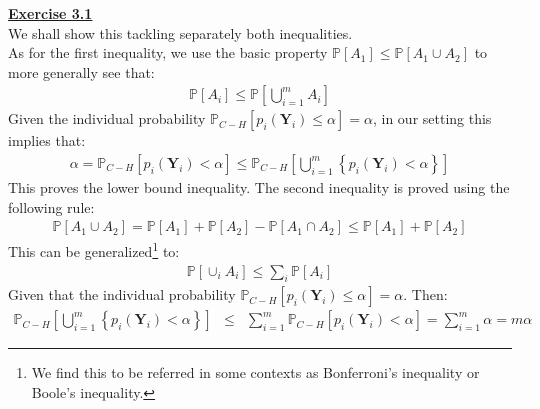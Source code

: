 \documentclass[a4paper, 11pt]{article}
\begin{document}
\newpage
\textbf{\underline{Exercise 3.1}}\\
\newline We shall show this tackling separately both inequalities.\\
\newline As for the first inequality, we use the basic property $\mathbb{P}[A_1] \leq \mathbb{P}[A_1 \cup A_2]$ to more generally see that:
\begin{eqnarray}
\mathbb{P}[A_i] \leq \mathbb{P}\left[ \bigcup_{i=1}^{m} A_i \right] \nonumber
\end{eqnarray}
Given the individual probability $\mathbb{P}_{C-H}[p_{i}(\mathbf{Y}_i) \leq \alpha] = \alpha$, in our setting this implies that:
\begin{eqnarray}
\alpha = \mathbb{P}_{C-H}[p_i(\mathbf{Y}_i) < \alpha] \leq \mathbb{P}_{C-H} \left[ \bigcup_{i=1}^{m} \left\lbrace p_i(\mathbf{Y}_i) < \alpha \right\rbrace \right] \nonumber
\end{eqnarray}
This proves the lower bound inequality. The second inequality is proved using the following rule:
\begin{eqnarray}
\mathbb{P}[A_1 \cup A_2] = \mathbb{P}[A_1] + \mathbb{P}[A_2] - \mathbb{P}[A_1 \cap A_2] \leq \mathbb{P}[A_1] + \mathbb{P}[A_2] \nonumber
\end{eqnarray}
This can be generalized\footnote{We find this to be referred in some contexts as Bonferroni's inequality or Boole's inequality.} to:
\begin{eqnarray}
\mathbb{P}[\cup_i A_i] \leq \sum_i \mathbb{P}[A_i] \nonumber
\end{eqnarray}
Given that the individual probability $\mathbb{P}_{C-H}[p_{i}(\mathbf{Y}_i) \leq \alpha] = \alpha$. Then:
\begin{eqnarray}
\mathbb{P}_{C-H} \left[ \bigcup_{i=1}^{m} \left\{ p_i(\mathbf{Y}_i) < \alpha \right\} \right] &\leq& \sum_{i=1}^{m} \mathbb{P}_{C-H} [ p_i(\mathbf{Y}_i) < \alpha ] = \sum_{i=1}^{m} \alpha = m \alpha \nonumber
\end{eqnarray}
\end{document}
